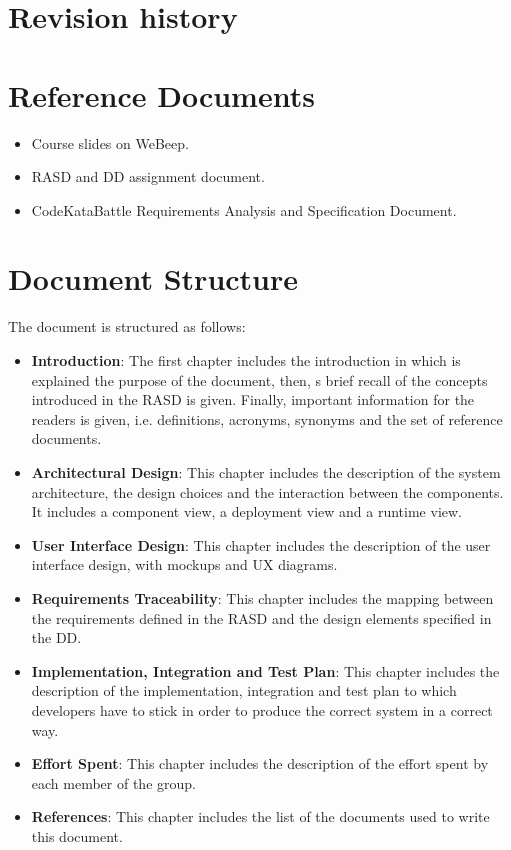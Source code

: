 \section{Revision history}

\section{Reference Documents}
\begin{itemize}
    \item Course slides on WeBeep. 
    \item RASD and DD assignment document.
    \item CodeKataBattle Requirements Analysis and Specification Document.
\end{itemize}

\section{Document Structure}
The document is structured as follows:
\begin{itemize}
    \item \textbf{Introduction}: The first chapter includes the introduction in which is explained the purpose of the document, then, s brief recall of the concepts introduced in the RASD is given.
    Finally, important information for the readers is given, i.e. definitions, acronyms, synonyms and the set of reference documents.
    \item \textbf{Architectural Design}: This chapter includes the description of the system architecture, the design choices and the interaction between the components. It includes a component view, a deployment view and a runtime view.
    \item \textbf{User Interface Design}: This chapter includes the description of the user interface design, with mockups and UX diagrams.
    \item \textbf{Requirements Traceability}: This chapter includes the mapping between the requirements defined in the RASD and the design elements specified in the DD.
    \item \textbf{Implementation, Integration and Test Plan}: This chapter includes the description of the implementation, integration and test plan to which developers have to stick in order to produce the correct system in a correct way.
    \item \textbf{Effort Spent}: This chapter includes the description of the effort spent by each member of the group.
    \item \textbf{References}: This chapter includes the list of the documents used to write this document.
\end{itemize}